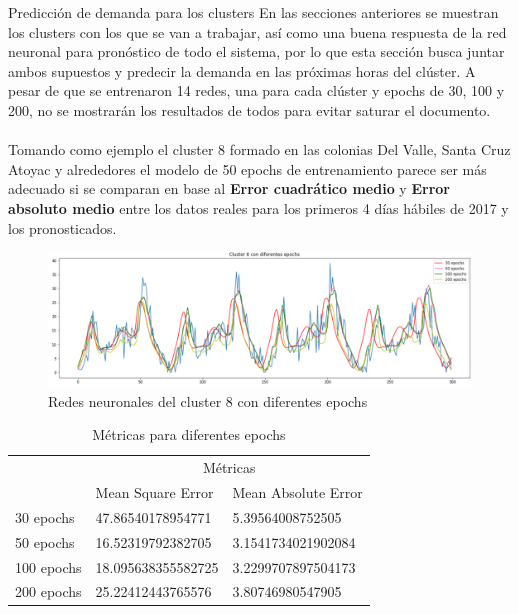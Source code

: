 \documentclass[12pt,spanish]{article}
\makeatletter
\newcounter{numberofruns}%
\newcommand{\secfig@@writecounterstage}{1}%
\newcommand{\secfig@@readcounterstage}{2}%
\newcommand{\secfig@@writecontentstage}{2}%
\newlength{\loftsectionbeforeskipamount}%
\newlength{\loftsectionafterskipamount}%
\newcommand{\loftsectionbeforeskip}{\vspace{\loftsectionbeforeskipamount}}%
\newcommand{\loftsectionafterskip}{\vspace{\loftsectionafterskipamount}}%
\newcounter{totalsections}
\let\LaTeXStandardSection\section%
\newcommand{\unstarredsection@@noopt}[1]{%
	\unstarredsection@@opt[#1]{#1}%
}%
\newcommand{\StoreCounterValue}[1]{%
	\immediate\expandafter\write\csname #1countsout\endcsname{%
		\number\value{#1}%
	}%
}%
\newcommand{\LoadAllStoredCounterValues}[1]{%
	\ifnumequal{\number\value{#1}}{\secfig@@readcounterstage}{%
		\read\figurecountsin to \lastsectionfigures
		\read\tablecountsin  to \lastsectiontables%
	}{}%
}%
\newcommand{\loftsectioncontentsline}[1]{%
	\loftsectionbeforeskip\textbf{\large\thesection~#1}\loftsectionafterskip
}%
\newcommand{\unstarredsection@@opt}[2][]{%
	\iftoggle{SectionsInLOFT}{%
		\FloatBarrier%
		\gdef\lastsectionfigures{0}%
		\gdef\lastsectiontables{0}%
		\ifnumequal{\number\value{numberofruns}}{\secfig@@writecounterstage}{%
			\gdef\lastsectionfigures{\number\value{figure}}%
			\gdef\lastsectionfigures{\number\value{table}}%
			\ifnumequal{\number\value{totalsections}}{0}{%
			}{%
				\StoreCounterValue{figure}%
				\StoreCounterValue{table}%
			}%
		}{%
			\LoadAllStoredCounterValues{numberofruns}%
		}%
	}{%
	}%
	\LaTeXStandardSection[#1]{#2}%
	\iftoggle{SectionsInLOFT}{%
		\ifnumequal{\number\value{numberofruns}}{\secfig@@writecontentstage}{%
			\ifnumgreater{\lastsectionfigures}{0}{%
				\typeout{Writing a section entry for \thesection{}to the LOF}%
				\iftoggle{AppendixSectionsInLOF}{%
					\addtocontents{lof}{\loftsectioncontentsline{#1}}%
				}{}%
			}{%
				\typeout{No figures in \thesection!}
			}%
			\ifnumgreater{\lastsectiontables}{0}{%
				\typeout{Writing a section entry for \thesection{}to the LOT}%
				\iftoggle{AppendixSectionsInLOT}{%
					\addtocontents{lot}{\loftsectioncontentsline{#1}}%
				}{}%
			}{%
				\typeout{No tables in \thesection!}
			}%
		}{}%
	}{%
	}%
}%
\newcommand{\unstarredsection}{%
	\@ifnextchar[{%
		\unstarredsection@@opt%
	}{%
		\unstarredsection@@noopt%
	}%
}%
\newcommand{\starredsection}[1]{%
	\LaTeXStandardSection*{#1}%
}%
\renewcommand{\section}{%
	\@ifstar{%
		\starredsection%
	}{%
		\unstarredsection%
	}%
}%
\makeatother
\begin{document}
	\section{Predicción de demanda para los clusters}
	En las secciones anteriores se muestran los clusters con los que se van a trabajar, así como una buena respuesta de la red neuronal para pronóstico de todo el sistema, por lo que esta sección busca juntar ambos supuestos y predecir la demanda en las próximas horas del clúster. A pesar de que se entrenaron 14 redes, una para cada clúster y epochs de 30, 100 y 200, no se mostrarán los resultados de todos para evitar saturar el documento.\\\\
	Tomando como ejemplo el cluster 8 formado en las colonias Del Valle, Santa Cruz Atoyac y alrededores el modelo de 50 epochs de entrenamiento parece ser más adecuado si se comparan en base al \textbf{Error cuadrático medio} y \textbf{Error absoluto medio} entre los datos reales para los primeros 4 días hábiles de 2017 y los pronosticados.
	\begin{figure}[H]
		\centering
		\includegraphics[width=15cm]{Imagenes/m8_many.PNG}
		\begin{centering}
			\caption{Redes neuronales del cluster 8 con diferentes epochs}
		\end{centering}
	\end{figure}
	\begin{table}[H]
		\centering
		\caption{Métricas para diferentes epochs}
		\label{my-label}
		\begin{tabular}{ | l | l | l |}
			\hline
			& \multicolumn{2}{|c|}{Métricas}\\ \cline{2-3}
			& Mean Square Error & Mean Absolute Error \\ \hline
			30 epochs & 47.86540178954771 & 5.39564008752505\\ \hline
			50 epochs & 16.52319792382705 & 3.1541734021902084 \\ \hline
			100 epochs & 18.095638355582725 & 3.2299707897504173 \\ \hline
			200 epochs & 25.22412443765576 & 3.80746980547905 \\ \hline
		\end{tabular}
	\end{table}
\end{document}
